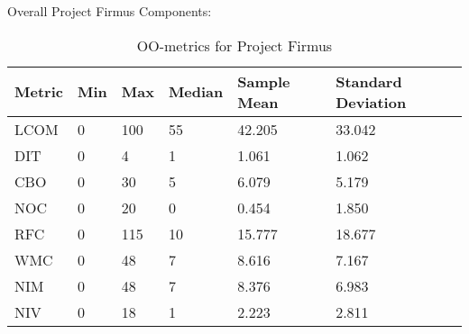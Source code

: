Overall Project Firmus Components:

\begin{table}[]
\centering
\caption{OO-metrics for Project Firmus}
\label{tab:oometrics-firmus}
\begin{tabular}{|l|l|l|l|l|l|}
\hline
\textbf{Metric} & \textbf{Min} & \textbf{Max} & \textbf{Median} & \textbf{Sample Mean} & \textbf{Standard Deviation} \\ \hline
LCOM            & 0            & 100          & 55              & 42.205               & 33.042                      \\ \hline
DIT             & 0            & 4            & 1               & 1.061                & 1.062                       \\ \hline
CBO             & 0            & 30           & 5               & 6.079                & 5.179                       \\ \hline
NOC             & 0            & 20           & 0               & 0.454                & 1.850                       \\ \hline
RFC             & 0            & 115          & 10              & 15.777               & 18.677                      \\ \hline
WMC             & 0            & 48           & 7               & 8.616                & 7.167                       \\ \hline
NIM             & 0            & 48           & 7               & 8.376                & 6.983                       \\ \hline
NIV             & 0            & 18           & 1               & 2.223                & 2.811                       \\ \hline
\end{tabular}
\end{table}



